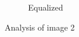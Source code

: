\begin{figure}[H]
\begin{subfigure}[b]{0.3\textwidth}
        \caption{Equalized}
        \label{fig:img2_histEq}
    \end{subfigure}
    \caption{Analysis of image 2}\label{fig:img2}
\end{figure}
